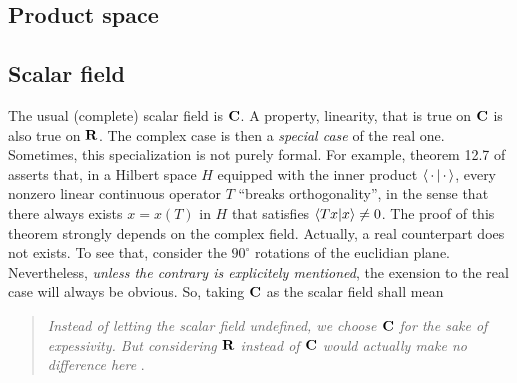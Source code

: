 \subsection{Product space}
\subsection{Scalar field}%
The usual (complete) scalar field is ${\mathbf C}$. %
A property, \eg linearity, that is true on ${\mathbf C}$ is also true on ${\mathbf R}$. %
The complex case is then a {\it special case} of the real one. %
Sometimes, this specialization is not purely formal. %
For example, theorem 12.7 of \cite{FA} asserts that, in a Hilbert space $H$ %
equipped with the inner product $\bra{\,\cdot\,}\ket{\,\cdot\,}$, %
every nonzero linear continuous operator $T$ ``breaks orthogonality'', %
in the sense that there always exists $x=x(T)$ in $H$ that satisfies %
%
  $\bra{Tx}\ket{x} \neq 0$. %
%
The proof of this theorem strongly depends on the complex field. %
Actually, a real counterpart does not exists. %
To see that, consider the $90^\circ$ rotations of the euclidian plane. %
%
Nevertheless, {\it unless the contrary is explicitely mentioned}, %
the exension to the real case will always be obvious. %
So, taking ${\mathbf C}$ as the scalar field shall mean %
%
\begin{quote}{\it %
Instead of letting the scalar field undefined, we choose ${\mathbf C}$ for the sake of %
expessivity. But considering ${\mathbf R}$ instead of %
${\mathbf C}$ would actually make no difference here
}. %
\end{quote}
%
